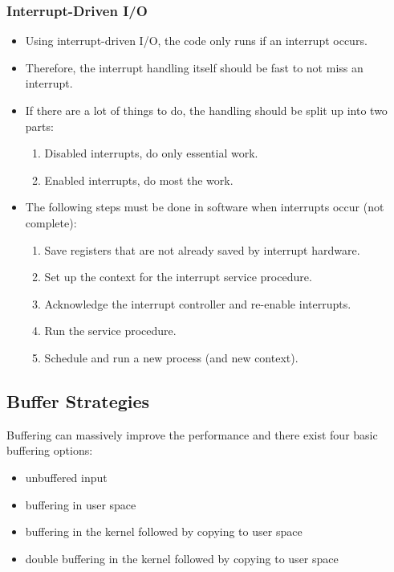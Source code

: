             \subsubsection{Interrupt-Driven I/O}
                \begin{itemize}
                	\item Using interrupt-driven I/O, the code only runs if an interrupt occurs.
                	\item Therefore, the interrupt handling itself should be fast to not miss an interrupt.
                	\item If there are a lot of things to do, the handling should be split up into two parts:
                    	\begin{enumerate}
                    		\item Disabled interrupts, do only essential work.
                    		\item Enabled interrupts, do most the work.
                    	\end{enumerate}
                	\item The following steps must be done in software when interrupts occur (not complete):
                    	\begin{enumerate}
                    		\item Save registers that are not already saved by interrupt hardware.
                    		\item Set up the context for the interrupt service procedure.
                    		\item Acknowledge the interrupt controller and re-enable interrupts.
                    		\item Run the service procedure.
                    		\item Schedule and run a new process (and new context).
                    	\end{enumerate}
                \end{itemize}

        \subsection{Buffer Strategies}
            Buffering can massively improve the performance and there exist four basic buffering options:
            \begin{itemize}
            	\item unbuffered input
            	\item buffering in user space
            	\item buffering in the kernel followed by copying to user space
            	\item double buffering in the kernel followed by copying to user space
            \end{itemize}

